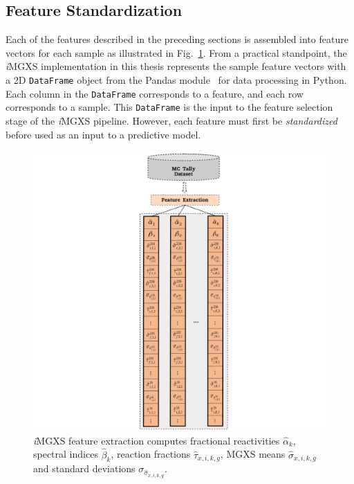 \subsection{Feature Standardization}
\label{subsec:chap10-feature-standardize}

Each of the features described in the preceding sections is assembled into feature vectors for each sample as illustrated in Fig.~\ref{fig:chap10-features-example}. From a practical standpoint, the \textit{i}\ac{MGXS} implementation in this thesis represents the sample feature vectors with a 2D \texttt{DataFrame} object from the Pandas module~\cite{mckinney2010pandas} for data processing in Python. Each column in the \texttt{DataFrame} corresponds to a feature, and each row corresponds to a sample. This \texttt{DataFrame} is the input to the feature selection stage of the \textit{i}\ac{MGXS} pipeline. However, each feature must first be \textit{standardized} before used as an input to a predictive model.

\begin{figure}[h!]
\centering
\includegraphics[width=0.95\linewidth]{figures/unsupervised/features/engineering/features}
\vspace{2mm}
\caption[Example \textit{i}MGXS sample feature vectors]{\textit{i}\ac{MGXS} feature extraction computes fractional reactivities $\hat{\alpha}_{k}$, spectral indices $\hat{\beta}_{k}$, reaction fractions $\hat{\tau}_{x,i,k,g}$, \ac{MGXS} means $\hat{\sigma}_{x,i,k,g}$ and standard deviations $\sigma_{\hat{\sigma}_{x,i,k,g}}$.}
\label{fig:chap10-features-example}
\end{figure}

